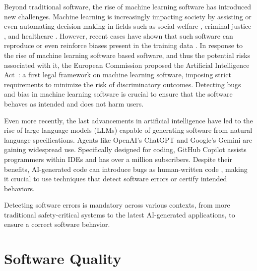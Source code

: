 Beyond traditional software, the rise of machine learning software has introduced new challenges.
Machine learning is increasingly impacting society by assisting or even automating decision-making in fields such as social welfare , criminal justice , and healthcare .
However, recent cases have shown that such software can reproduce or even reinforce biases present in the training data \cite{Buolamwini2018,Kay2015,Larson2016,Obermeyer2019}.
In response to the rise of machine learning software based software, and thus the potential risks associated with it, the European Commission proposed the Artificial Intelligence Act~: a first legal framework on machine learning software, imposing strict requirements to minimize the risk of discriminatory outcomes.
Detecting bugs and bias in machine learning software is crucial to ensure that the software behaves as intended and does not harm users.


Even more recently, the last advancements in artificial intelligence have led to the rise of large language models (LLMs) capable of generating software from natural language specifications.
Agents like OpenAI's ChatGPT and Google's Gemini are gaining widespread use.
Specifically designed for coding, GitHub Copilot assists programmers within IDEs and has over a million subscribers.
Despite their benefits, AI-generated code can introduce bugs as human-written code , making it crucial to use techniques that detect software errors or certify intended behaviors.

Detecting software errors is mandatory across various contexts, from more traditional safety-critical systems to the latest AI-generated applications, to ensure a correct software behavior.

\section{Software Quality}

